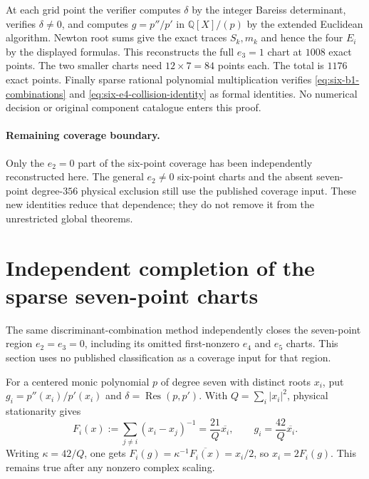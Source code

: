 \documentclass[11pt]{article}
\theoremstyle{remark}
\numberwithin{equation}{section}
\begin{document}
At each grid point the verifier computes $\delta$ by the integer
Bareiss determinant, verifies $\delta\ne0$, and computes $g=p''/p'$ in
$\mathbb Q[X]/(p)$ by the extended Euclidean algorithm. Newton root
sums give the exact traces $S_k,m_k$ and hence the four $E_i$ by the
displayed formulas. This reconstructs the full $e_3=1$ chart at
$1008$ exact points. The two smaller charts need $12\times7=84$
points each. The total is $1176$ exact points. Finally sparse rational
polynomial multiplication verifies
\eqref{eq:six-b1-combinations} and
\eqref{eq:six-e4-collision-identity} as formal identities. No numerical
decision or original component catalogue enters this proof.

\paragraph{Remaining coverage boundary.}
Only the $e_2=0$ part of the six-point coverage has been independently
reconstructed here. The general $e_2\ne0$ six-point charts and the
absent seven-point degree-$356$ physical exclusion still use the
published coverage input. These new identities reduce that dependence;
they do not remove it from the unrestricted global theorems.

\section{Independent completion of the sparse seven-point charts}
\label{sec:seven-sparse-independent}

The same discriminant-combination method independently closes the
seven-point region $e_2=e_3=0$, including its omitted first-nonzero
$e_4$ and $e_5$ charts. This section uses no published classification
as a coverage input for that region.

For a centered monic polynomial $p$ of degree seven with distinct roots
$x_i$, put $g_i=p''(x_i)/p'(x_i)$ and
$\delta=\operatorname{Res}(p,p')$. With
$Q=\sum_i|x_i|^2$, physical stationarity gives
\[
 F_i(x):=\sum_{j\ne i}(x_i-x_j)^{-1}
 =\frac{21}{Q}\overline{x_i},\qquad
 g_i=\frac{42}{Q}\overline{x_i}.
\]
Writing $\kappa=42/Q$, one gets
$F_i(g)=\kappa^{-1}\overline{F_i(x)}=x_i/2$, so
$x_i=2F_i(g)$. This remains true after any nonzero complex scaling.
\end{document}
